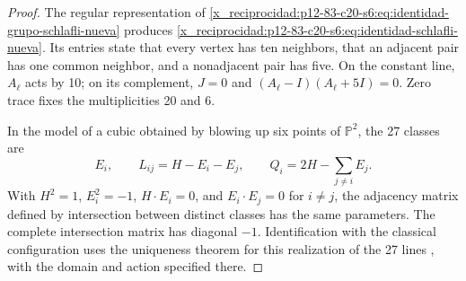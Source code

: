\begin{proof}
The regular representation of
\cref{x_reciprocidad:p12-83-c20-s6:eq:identidad-grupo-schlafli-nueva} produces
\cref{x_reciprocidad:p12-83-c20-s6:eq:identidad-schlafli-nueva}. Its entries state that every vertex
has ten neighbors, that an adjacent pair has one common neighbor, and a
nonadjacent pair has five. On the constant line, \(A_\ell\) acts by 10;
on its complement, \(J=0\) and
\((A_\ell-I)(A_\ell+5I)=0\). Zero trace fixes the multiplicities 20 and 6.

In the model of a cubic obtained by blowing up six points of
\(\mathbb P^2\), the 27 classes are
\[
 E_i,\qquad L_{ij}=H-E_i-E_j,\qquad
 Q_i=2H-\sum_{j\ne i}E_j.
\]
With \(H^2=1\), \(E_i^2=-1\), \(H\cdot E_i=0\), and
\(E_i\cdot E_j=0\) for \(i\ne j\), the adjacency matrix defined
by intersection between distinct classes has the same parameters.
The complete intersection matrix has diagonal \(-1\).
Identification with the classical configuration uses the
uniqueness theorem for this realization of the 27 lines
\cite{x_reciprocidad:Manivel2005}, with the domain and action specified there.
\end{proof}

